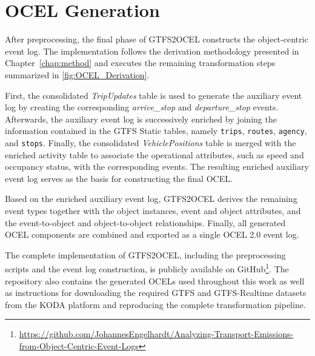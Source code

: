 \section{OCEL Generation}

After preprocessing, the final phase of GTFS2OCEL constructs the object-centric event log. The implementation follows the derivation methodology presented in Chapter~\ref{chap:method} and executes the remaining transformation steps summarized in \autoref{fig:OCEL_Derivation}.

First, the consolidated \textit{TripUpdates} table is used to generate the auxiliary event log by creating the corresponding \textit{arrive\_stop} and \textit{departure\_stop} events. Afterwards, the auxiliary event log is successively enriched by joining the information contained in the GTFS Static tables, namely \texttt{trips}, \texttt{routes}, \texttt{agency}, and \texttt{stops}. Finally, the consolidated \textit{VehiclePositions} table is merged with the enriched activity table to associate the operational attributes, such as speed and occupancy status, with the corresponding events. The resulting enriched auxiliary event log serves as the basis for constructing the final OCEL.

Based on the enriched auxiliary event log, GTFS2OCEL derives the remaining event types together with the object instances, event and object attributes, and the event-to-object and object-to-object relationships. Finally, all generated OCEL components are combined and exported as a single OCEL 2.0 event log.

The complete implementation of GTFS2OCEL, including the preprocessing scripts and the event log construction, is publicly available on GitHub\footnote{\url{https://github.com/JohannesEngelhardt/Analyzing-Transport-Emissions-from-Object-Centric-Event-Logs}}. The repository also contains the generated OCELs used throughout this work as well as instructions for downloading the required GTFS and GTFS-Realtime datasets from the KODA platform and reproducing the complete transformation pipeline.






